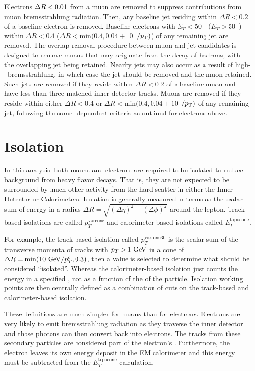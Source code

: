 Electrons $\Delta R < 0.01$ from a muon are removed to suppress contributions from muon bremsstrahlung radiation. Then, any baseline jet residing within $\Delta R < 0.2$ of a baseline electron is removed.  Baseline electrons with $E_{T}<50$~\GeV\ ($E_{T}>50$~\GeV) within $\Delta R < 0.4$ ($\Delta R < \mathrm{min}(0.4,0.04+10$~\GeV$/p_{\text{T}})$) of any remaining jet are removed. The overlap removal procedure between muon and jet candidates is designed to remove muons that may originate from the decay of hadrons, with the overlapping jet being retained. Nearby jets may also occur as a result of high-\pt\ bremsstrahlung, in which case the jet should be removed and the muon retained. Such jets are removed if they reside within $\Delta R < 0.2$ of a baseline muon and have less than three matched inner detector tracks. Muons are removed if they reside within either $\Delta R < 0.4$ or $\Delta R < \mathrm{min}(0.4,0.04+10$~\GeV$/p_{\text{T}})$ of any remaining jet, following the same \pt-dependent criteria as outlined for electrons above.


\section{Isolation}
\label{sec:isolation}

In this analysis, both muons and electrons are required to be isolated to reduce background from heavy flavor decays. That is, they are not expected to be surrounded by much other activity from the hard scatter in either the Inner Detector or Calorimeters. Isolation is generally measured in terms as the scalar sum of energy in a radius $\Delta R = \sqrt{(\Delta \eta)^2 + (\Delta \phi)^2}$ around the lepton. Track based isolations are called $p_{T}^{\textrm{varcone}}$ and calorimeter based isolations called $E_{T}^{\textrm{topocone}}$. 

For example, the track-based isolation called $p_{T}^{\textrm{varcone30}}$ is the scalar sum of the transverse momenta of tracks with $p_{T} > 1 \GeV$ in a cone of $\Delta R = \textrm{min}(10 \GeV/p_{T}^{\ell}, 0.3)$, then a value is selected to determine what should be considered ``isolated''. Whereas the calorimeter-based isolation just counts the energy in a specified \dR, not as a function of the \pt of the particle. Isolation working points are then centrally defined as a combination of cuts on the track-based and calorimeter-based isolation. 

These definitions are much simpler for muons than for electrons. Electrons are very likely to emit bremsstrahlung radiation as they traverse the inner detector and those photons can then convert back into electrons. The tracks from these secondary particles are considered part of the electron's \pT. Furthermore, the electron leaves its own energy deposit in the \ac{EM} calorimeter and this energy must be subtracted from the $E_{T}^{\textrm{topocone}}$ calculation.


